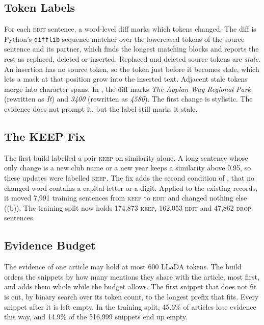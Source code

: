\documentclass[]{paper}
\newcommand{\keep}{\textsc{keep}}
\newcommand{\edit}{\textsc{edit}}
\newcommand{\drop}{\textsc{drop}}
\begin{document}
\subsection{Token Labels}

For each \edit{} sentence, a word-level diff marks which tokens changed. The diff is Python's \texttt{difflib} sequence matcher over the lowercased tokens of the source sentence and its partner, which finds the longest matching blocks and reports the rest as replaced, deleted or inserted. Replaced and deleted source tokens are \emph{stale}. An insertion has no source token, so the token just before it becomes stale, which lets a mask at that position grow into the inserted text. Adjacent stale tokens merge into character spans. In , the diff marks \emph{The Appian Way Regional Park} (rewritten as \emph{It}) and \emph{3400} (rewritten as \emph{4580}). The first change is stylistic. The evidence does not prompt it, but the label still marks it stale.

\subsection{The KEEP Fix}
\label{sec:keepfix}

The first build labelled a pair \keep{} on similarity alone. A long sentence whose only change is a new club name or a new year keeps a similarity above 0.95, so these updates were labelled \keep{}. The fix adds the second condition of , that no changed word contains a capital letter or a digit. Applied to the existing records, it moved 7,991 training sentences from \keep{} to \edit{} and changed nothing else ((b)). The training split now holds 174,873 \keep{}, 162,053 \edit{} and 47,862 \drop{} sentences.

\subsection{Evidence Budget}
\label{sec:evidence}

The evidence of one article may hold at most 600 LLaDA tokens. The build orders the snippets by how many mentions they share with the article, most first, and adds them whole while the budget allows. The first snippet that does not fit is cut, by binary search over its token count, to the longest prefix that fits. Every snippet after it is left empty. In the training split, 45.6\% of articles lose evidence this way, and 14.9\% of the 516,999 snippets end up empty.
\end{document}
